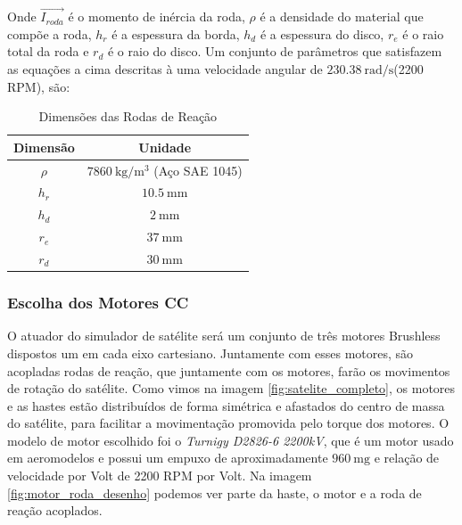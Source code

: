 Onde $\vec{I_{roda}}$ é o momento de inércia da roda, $\rho$ é a densidade do material que compõe a roda, $h_r$ é a espessura da borda, $h_d$ é a espessura do disco, $r_e$ é o raio total da roda e $r_d$ é o raio do disco. Um conjunto de parâmetros que satisfazem as equações a cima descritas à uma velocidade angular de $\SI{230.38}{\radian\per\second}$(2200 RPM), são: 

\begin{table}
  \caption{Dimensões das Rodas de Reação}
  \label{tab:bias_correction}
  \centering%
  \begin{minipage}{.42\textwidth}
    \begin{tabular*}{\textwidth}{cc}
      \hline
      {Dimensão} & Unidade \\ \hline
      \hline
      $\rho$  &  $\SI{7860}{\kilogram\per\cubic\metre}$ (Aço SAE 1045)\\ 
      $h_r$   &  $\SI{10.5}{\milli\metre}$ \\
      $h_d$   &  $\SI{2}{\milli\metre}$  \\
      $r_e$   &  $\SI{37}{\milli\metre}$  \\
      $r_d$   &  $\SI{30}{\milli\metre}$  \\ \hline
    \end{tabular*}
  \end{minipage}
\end{table}



\subsubsection{Escolha dos Motores CC}

O atuador do simulador de satélite será um conjunto de três motores Brushless dispostos um em cada eixo cartesiano. Juntamente com esses motores, são acopladas rodas de reação, que juntamente com os motores, farão os movimentos de rotação do satélite. Como vimos na imagem \ref{fig:satelite_completo}, os motores e as hastes estão distribuídos de forma simétrica e afastados do centro de massa do satélite, para facilitar a movimentação promovida pelo torque dos motores. O modelo de motor escolhido foi o \textit{Turnigy D2826-6 2200kV}, que é um motor usado em aeromodelos e possui um empuxo de aproximadamente $\SI{960}{\milli\gram}$ e relação de velocidade por Volt de 2200 RPM por Volt. Na imagem \ref{fig:motor_roda_desenho} podemos ver parte da haste, o motor e a roda de reação acoplados. 

